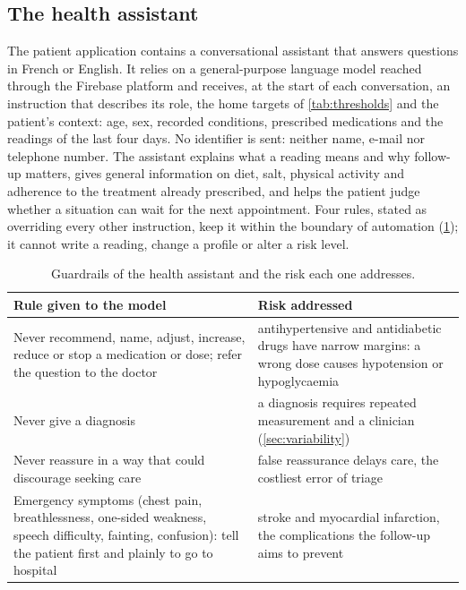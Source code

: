 \subsection{The health assistant}\label{sec:assistant}

The patient application contains a conversational assistant that answers questions in French or English. It relies on a general-purpose language model reached through the Firebase platform and receives, at the start of each conversation, an instruction that describes its role, the home targets of \cref{tab:thresholds} and the patient's context: age, sex, recorded conditions, prescribed medications and the readings of the last four days. No identifier is sent: neither name, e-mail nor telephone number. The assistant explains what a reading means and why follow-up matters, gives general information on diet, salt, physical activity and adherence to the treatment already prescribed, and helps the patient judge whether a situation can wait for the next appointment. Four rules, stated as overriding every other instruction, keep it within the boundary of automation (\cref{tab:assistant-guardrails}); it cannot write a reading, change a profile or alter a risk level.

\begin{table}[htbp]
\centering\footnotesize
\caption{Guardrails of the health assistant and the risk each one addresses.}\label{tab:assistant-guardrails}
\begin{tabularx}{\textwidth}{@{}>{\raggedright\arraybackslash}p{5.6cm} X@{}}
\toprule
\textbf{Rule given to the model} & \textbf{Risk addressed} \\
\midrule
Never recommend, name, adjust, increase, reduce or stop a medication or dose; refer the question to the doctor & antihypertensive and antidiabetic drugs have narrow margins: a wrong dose causes hypotension or hypoglycaemia \\
Never give a diagnosis & a diagnosis requires repeated measurement and a clinician (\cref{sec:variability}) \\
Never reassure in a way that could discourage seeking care & false reassurance delays care, the costliest error of triage \\
Emergency symptoms (chest pain, breathlessness, one-sided weakness, speech difficulty, fainting, confusion): tell the patient first and plainly to go to hospital & stroke and myocardial infarction, the complications the follow-up aims to prevent \\
\bottomrule
\end{tabularx}
\end{table}

